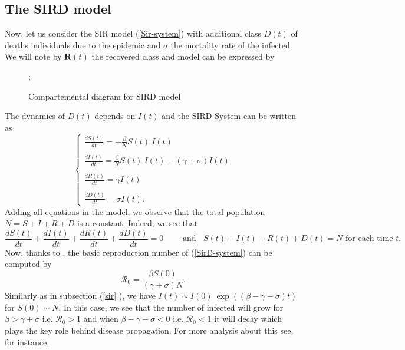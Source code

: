 \documentclass[final,a4paper,reqno]{elsarticle}
\numberwithin{equation}{section}
\begin{document}
\subsection{ The SIRD  model }
Now, let us consider the SIR model (\ref{Sir-system}) with additional class $D(t)$ of deaths individuals  due to the epidemic and $\sigma$ the mortality rate of the infected.  
We will note by $\textbf{R}(t)$  the recovered class and model can be expressed by
\begin{figure}[!h]
\centering
{}
\caption{ Compartemental diagram for SIRD model};
\end{figure}

The dynamics of $D(t)$ depends on $I(t)$ and the SIRD System can be written as
\begin{equation}\label{SirD-system}
\begin{cases}
\displaystyle \frac{ dS(t)}{dt} = -\frac{\beta}{N} S(t) \: I(t)\\ \\
\displaystyle  \frac{ dI(t)}{dt}  = \frac{\beta}{N} S(t) \: I(t) -(\gamma+\sigma) I(t)\\  \\
\displaystyle  \frac{ dR(t)}{dt} = \gamma I(t) \\ \\
\displaystyle  \frac{ dD(t)}{dt} = \sigma I(t).
\end{cases}
\end{equation}
 Adding all equations in the model, we observe that  the total population  $N=S+I+R+D$ is a constant. Indeed, we see that   
$$ \displaystyle \frac{ dS(t)}{dt} +   \frac{ dI(t)}{dt}  +  \frac{ dR(t)}{dt}+\frac{ dD(t)}{dt} = 0 \qquad \mbox{ and }\;\;  S(t)+I(t)+R(t)+D(t)= N\mbox{ for each time  } t.$$
Now, thanks to  \cite{Mu},  the basic reproduction number of  (\ref{SirD-system}) can be computed by $$\mathcal{R}_0=  \frac{\beta S(0)}{ (\gamma+\sigma)N}.$$ 
Similarly as in subsection (\ref{sir} ),  we have $ \displaystyle  I(t)  \sim I(0) \: \exp((\beta-\gamma-\sigma)t)$ for $S(0)\sim N$. In this case,   we see that  the number of infected will grow for  $\beta>\gamma+\sigma$ i.e.  $\mathcal{R}_0>1$ and when  $\beta-\gamma -\sigma<0$ i.e.  $\mathcal{R}_0<1$ it will decay which plays the key role behind disease propagation. For more analysis about this  see, for instance\cite{We, Mu,DiHe}.
\end{document}
